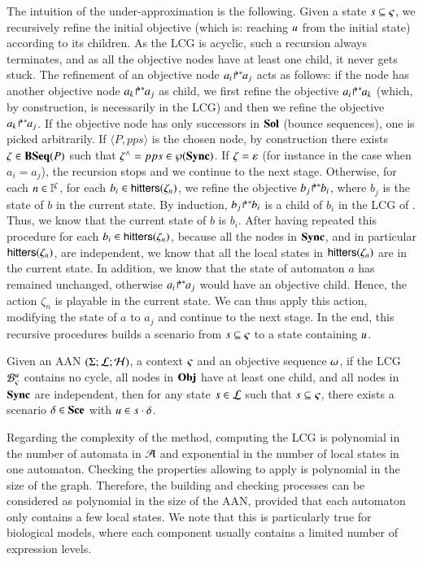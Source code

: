 The intuition of the under-approximation is the following.
Given a state $s\subseteq\varsigma$, we recursively refine the initial objective
(which is: reaching $u$ from the initial state) according to its children.
As the LCG is acyclic, such a recursion always terminates, and as all the objective nodes have at
least one child, it never gets stuck.
The refinement of an objective node ${a_i\!\Rsh^*\!\!a_j}$ acts as follows:
if the node has another objective node ${a_k\!\Rsh^*\!\!a_j}$ as child, we first refine the objective
${a_i\!\Rsh^*\!\!a_k}$ (which, by construction, is necessarily in the LCG)
and then we refine the objective ${a_k\!\Rsh^*\!\!a_j}$.
If the objective node has only successors in $\mathbf{Sol}$ (bounce sequences), one is picked arbitrarily.
If $\langle P, pps\rangle$ is the chosen node,
by construction there exists $\zeta\in\mathbf{BSeq}(P)$ such that $\zeta^\wedge = pps \in \wp(\mathbf{Sync})$.
If $\zeta = \varepsilon$ (for instance in the case when $a_i = a_j$), the recursion stops and we
continue to the next stage.
Otherwise, for each $n\in\mathbb{I}^{\zeta}$,
for each $b_i \in\mathsf{hitters}(\zeta_n)$,
we refine the objective ${b_j\!\Rsh^*\!\!b_i}$, where $b_j$ is the state of $b$ in the current state.
By induction, ${b_j\!\Rsh^*\!\!b_i}$ is a child of $b_i$ in the LCG of .
Thus, we know that the current state of $b$ is $b_i$.
After having repeated this procedure for each $b_i\in\mathsf{hitters}(\zeta_n)$,
because all the nodes in $\mathbf{Sync}$, and in particular $\mathsf{hitters}(\zeta_n)$, are independent,
we know that all the local states in $\mathsf{hitters}(\zeta_n)$ are in the current state.
In addition, we know that the state of automaton $a$ has remained unchanged, otherwise
${a_i\!\Rsh^*\!\!a_j}$ would have an objective child.
Hence, the action $\zeta_n$ is playable in the current state.
We can thus apply this action, modifying the state of $a$ to $a_j$ and continue to the next stage.
In the end, this recursive procedures builds a scenario from $s\subseteq\varsigma$ to a state containing $u$.

\begin{theorem}
\label{th:approxinf}
  Given an AAN $(\Sigma; \mathcal{L}; \mathcal{H})$,
  a context $\varsigma$ and an objective sequence $\omega$,
  if the LCG ${\mathcal{B}_{\varsigma}^{u}}$ contains no cycle,
  all nodes in $\mathbf{Obj}$ have at least one child,
  and all nodes in $\mathbf{Sync}$ are independent,
  then for any state $s\in\mathcal{L}$ such that $s\subseteq\varsigma$,
  there exists a scenario $\delta\in\mathbf{Sce}$ with $u\in s\cdot\delta$.
\end{theorem}

Regarding the complexity of the method,
computing the LCG is polynomial in the number of automata in $\mathcal{A}$ and exponential in the number of local states in one automaton.
Checking the properties allowing to apply  is polynomial in the size of the graph.
Therefore, the building and checking processes can be considered as polynomial in the size
of the AAN, provided that each automaton only contains a few local states.
We note that this is particularly true for biological models, where
each component usually contains a limited number of expression levels.

